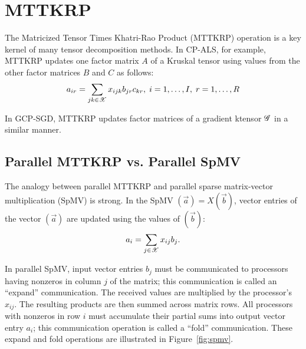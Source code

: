 
\chapter{MTTKRP} \label{sec:mttkrp}

The Matricized Tensor Times Khatri-Rao Product (MTTKRP) operation is a key 
kernel of many tensor decomposition methods.  In CP-ALS, for example,
MTTKRP updates one factor matrix $A$ of a Kruskal tensor using values from
the other factor matrices $B$ and $C$ as follows:
\begin{equation}
\label{eq:mttkrp}
a_{ir} = \sum_{jk \in \X} x_{ijk} b_{jr} c_{kr}, \; i=1,\ldots,I, \; r=1,\ldots,R
\end{equation}

In GCP-SGD, MTTKRP updates factor matrices of a gradient ktensor $\T G$ in a 
similar manner.

\section{Parallel MTTKRP vs. Parallel SpMV} \label{sec:spmv}

The analogy between parallel MTTKRP and parallel sparse matrix-vector
multiplication (SpMV) is strong.   In the SpMV $(\vec a) = X (\vec b)$, 
vector entries of the vector $(\vec a)$ are updated using the values 
of $(\vec b)$:
\begin{equation}
\label{eq:spmv}
a_i = \sum_{j \in \X} x_{ij} b_j.
\end{equation}
 
In parallel SpMV, input vector entries $b_j$ must be communicated to processors 
having nonzeros in column $j$ of the matrix; 
this communication is called an ``expand''
communication.  
The received values are multiplied by the processor's $x_{ij}$.
The resulting products are then summed across matrix rows.
All processors with nonzeros in row $i$ must accumulate their partial
sums into output vector entry $a_i$; this communication operation is 
called a ``fold'' communication.  These expand and fold operations are 
illustrated in Figure~\ref{fig:spmv}.

